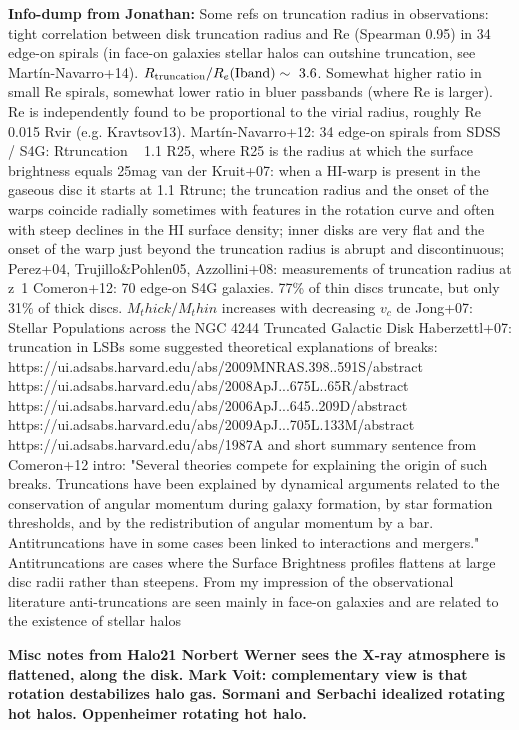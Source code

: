 \documentclass[fleqn,usenatbib]{mnras}
\begin{document}
\textbf{Info-dump from Jonathan:}
Some refs on truncation radius in observations:
\cite{Kregel2002} tight correlation between disk truncation radius and Re (Spearman 0.95) in 34 edge-on spirals (in face-on galaxies stellar halos can outshine truncation, see Martín-Navarro+14). $R_{\rm truncation} / R_e({\rm Iband}) \sim~ 3.6$. Somewhat higher ratio in small Re spirals, somewhat lower ratio in bluer passbands (where Re is larger).
Re is independently found to be proportional to the virial radius, roughly Re ~ 0.015 Rvir (e.g. Kravtsov13).
Martín-Navarro+12: 34 edge-on spirals from SDSS / S4G: Rtruncation ~ 1.1 R25, where R25 is the radius at which the surface brightness equals 25mag
van der Kruit+07: when a HI-warp is present in the gaseous disc it starts at 1.1 Rtrunc; the truncation radius and the onset of the warps coincide radially sometimes with features in the rotation curve and often with steep declines in the HI surface density; inner disks are very flat and the onset of the warp just beyond the truncation radius is abrupt and discontinuous;
Perez+04, Trujillo\&Pohlen05, Azzollini+08: measurements of truncation radius at z~1
Comeron+12: 70 edge-on S4G galaxies. 77\% of thin discs truncate, but only 31\% of thick discs. $M_thick/M_thin$ increases with decreasing $v_c$
de Jong+07: Stellar Populations across the NGC 4244 Truncated Galactic Disk
Haberzettl+07: truncation in LSBs
some suggested theoretical explanations of breaks:
https://ui.adsabs.harvard.edu/abs/2009MNRAS.398..591S/abstract
https://ui.adsabs.harvard.edu/abs/2008ApJ...675L..65R/abstract
https://ui.adsabs.harvard.edu/abs/2006ApJ...645..209D/abstract
https://ui.adsabs.harvard.edu/abs/2009ApJ...705L.133M/abstract
https://ui.adsabs.harvard.edu/abs/1987A%
and short summary sentence from Comeron+12 intro:
"Several theories compete for explaining the origin of such breaks. Truncations have been explained by dynamical arguments related to the conservation of angular momentum during galaxy formation, by star formation thresholds, and by the redistribution of angular momentum by a bar. Antitruncations have in some cases been linked to interactions and mergers."
Antitruncations are cases where the Surface Brightness profiles flattens at large disc radii rather than steepens. From my impression of the observational literature anti-truncations are seen mainly in face-on galaxies and are related to the existence of stellar halos

\textbf{
Misc notes from Halo21
Norbert Werner sees the X-ray atmosphere is flattened, along the disk.
Mark Voit: complementary view is that rotation destabilizes halo gas.
Sormani and Serbachi idealized rotating hot halos.
Oppenheimer rotating hot halo.
}
\end{document}

